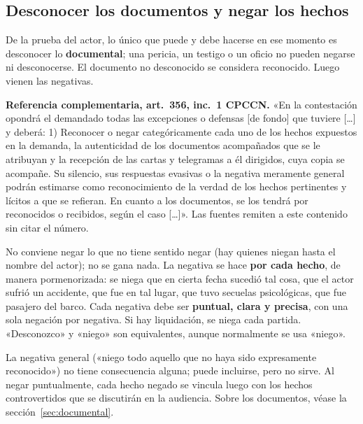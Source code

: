 \documentclass[12pt,oneside]{book}
\begin{document}
\subsection{Desconocer los documentos y negar los hechos}

De la prueba del actor, lo único que puede y debe hacerse en ese momento es desconocer lo \textbf{documental}; una pericia, un testigo o un oficio no pueden negarse ni desconocerse. El documento no desconocido se considera reconocido. Luego vienen las negativas.

\begin{nota}
\textbf{Referencia complementaria, art.~356, inc.~1 CPCCN.}
«En la contestación opondrá el demandado todas las excepciones o defensas [de fondo] que tuviere [\ldots] y deberá: 1) Reconocer o negar categóricamente cada uno de los hechos expuestos en la demanda, la autenticidad de los documentos acompañados que se le atribuyan y la recepción de las cartas y telegramas a él dirigidos, cuya copia se acompañe. Su silencio, sus respuestas evasivas o la negativa meramente general podrán estimarse como reconocimiento de la verdad de los hechos pertinentes y lícitos a que se refieran. En cuanto a los documentos, se los tendrá por reconocidos o recibidos, según el caso [\ldots]». Las fuentes remiten a este contenido sin citar el número.
\end{nota}

No conviene negar lo que no tiene sentido negar (hay quienes niegan hasta el nombre del actor); no se gana nada. La negativa se hace \textbf{por cada hecho}, de manera pormenorizada: se niega que en cierta fecha sucedió tal cosa, que el actor sufrió un accidente, que fue en tal lugar, que tuvo secuelas psicológicas, que fue pasajero del barco. Cada negativa debe ser \textbf{puntual, clara y precisa}, con una sola negación por negativa. Si hay liquidación, se niega cada partida. «Desconozco» y «niego» son equivalentes, aunque normalmente se usa «niego».

\begin{importante}
La negativa general («niego todo aquello que no haya sido expresamente reconocido») no tiene consecuencia alguna; puede incluirse, pero no sirve. Al negar puntualmente, cada hecho negado se vincula luego con los hechos controvertidos que se discutirán en la audiencia. Sobre los documentos, véase la sección~\ref{sec:documental}.
\end{importante}
\end{document}
